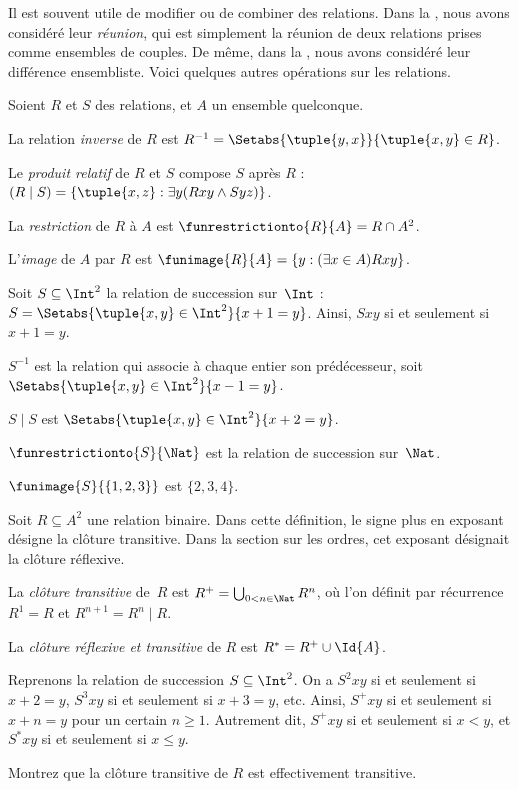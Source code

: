 \documentclass[../../../include/open-logic-section]{subfiles}
\begin{document}

Il est souvent utile de modifier ou de combiner des relations.
Dans la , nous avons considéré
leur \emph{réunion}, qui est simplement la réunion de deux relations
prises comme ensembles de couples. De même, dans la
, nous avons considéré
leur différence ensembliste. Voici quelques autres opérations sur les relations.

\begin{defn}
Soient $R$ et $S$ des relations, et $A$ un ensemble quelconque.

La relation \emph{inverse} de $R$ est
$R^{-1} = \Setabs{\tuple{y, x}}{\tuple{x, y} \in R}$.

Le \emph{produit relatif} de $R$ et $S$ compose $S$ après $R$ :
$(R \mid S) = \{\tuple{x, z} : \exists y(Rxy \land Syz)\}$.

La \emph{restriction} de $R$ à $A$ est
$\funrestrictionto{R}{A}= R \cap A^2$.

L’\emph{image} de $A$ par $R$ est
$\funimage{R}{A} = \{y : (\exists x \in A)Rxy\}$.
\end{defn}

\begin{ex}
Soit $S \subseteq \Int^2$ la relation de succession sur~$\Int$ :
$S = \Setabs{\tuple{x, y} \in \Int^2}{x + 1 = y}$.
Ainsi, $Sxy$ si et seulement si $x + 1 = y$.

$S^{-1}$ est la relation qui associe à chaque entier son prédécesseur,
soit $\Setabs{\tuple{x,y}\in\Int^2}{x -1 =y}$.

$S\mid S$ est $ \Setabs{\tuple{x,y}\in\Int^2}{x + 2 =y}$.

$\funrestrictionto{S}{\Nat}$ est la relation de succession sur~$\Nat$.

$\funimage{S}{\{1,2,3\}}$ est $\{2, 3, 4\}$.
\end{ex}

\begin{defn}
Soit $R \subseteq A^2$ une relation binaire.
Dans cette définition, le signe plus en exposant désigne la clôture
transitive. Dans la section sur les ordres, cet exposant désignait la
clôture réflexive.

La \emph{clôture transitive} de~$R$ est
$R^+ = \bigcup_{0 < n \in \Nat} R^n$, où l’on définit par récurrence
$R^1 = R$ et $R^{n+1} = R^n \mid R$.

La \emph{clôture réflexive et transitive} de $R$ est
$R^* = R^+ \cup \Id{A}$.
\end{defn}

\begin{ex}
Reprenons la relation de succession $S \subseteq \Int^2$.
On a $S^2xy$ si et seulement si $x + 2 = y$, $S^3xy$ si et seulement si
$x + 3 = y$, etc. Ainsi, $S^+xy$ si et seulement si $x + n = y$
pour un certain $n \geq 1$. Autrement dit, $S^+xy$ si et seulement si
$x < y$, et $S^*xy$ si et seulement si $x \le y$.
\end{ex}

\begin{prob}
Montrez que la clôture transitive de $R$ est effectivement transitive.
\end{prob}
\end{document}
